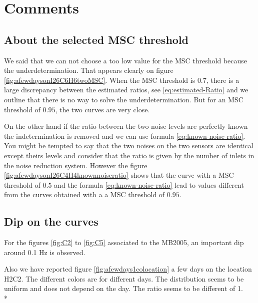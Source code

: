 \section{Comments}
\subsection{About the selected MSC threshold}
We said that we can not choose a too low value for the MSC threshold because the underdetermination. That appears clearly on figure \ref{fig:afewdaysonI26C6H6twoMSC}.
When the  MSC threshold is $0.7$, there is a large discrepancy between the estimated ratios, see \eqref{eq:estimated-Ratio} and we outline that there is no way to solve the underdetermination. But for an MSC threshold of $0.95$, the two curves are very close.


On the other hand if the ratio between the two noise levels are perfectly known the indetermination is removed and we can use formula \eqref{eq:known-noise-ratio}. You might be tempted to say that the two noises on the two sensors are identical except theirs levels and consider that the ratio is given by the number of inlets in the noise reduction system. However the figure \ref{fig:afewdaysonI26C4H4knownnoiseratio} shows that the curve with a MSC threshold of $0.5$ and the formula \eqref{eq:known-noise-ratio} lead to values different from the curves obtained with a a MSC threshold of $0.95$.


\newpage\clearpage
\subsection{Dip on the curves}
For the figures \ref{fig:C2} to \ref{fig:C5} associated to the MB2005, an important dip around 0.1 Hz is observed. 

Also we have reported figure \ref{fig:afewdays1colocation} a few days on the location H2C2. The different colors are for different days. The distribution seems to be uniform and does not depend on the day. The ratio seems to be different of 1.\\*

